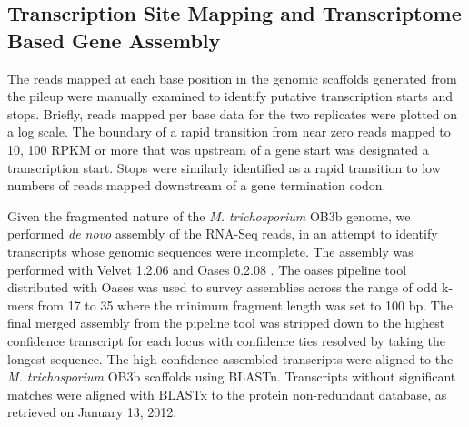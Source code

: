 \subsection{Transcription Site Mapping and Transcriptome Based Gene Assembly}
The reads mapped at each base position in the genomic scaffolds generated from the pileup were manually examined to identify putative transcription starts and stops.
Briefly, reads mapped per base data for the two replicates were plotted on a log scale.
The boundary of a rapid transition from near zero reads mapped to 10, 100 RPKM or more that was upstream of a gene start was designated a transcription start.
Stops were similarly identified as a rapid transition to low numbers of reads mapped downstream of a gene termination codon.

Given the fragmented nature of the \textit{M. trichosporium} OB3b genome, we performed \textit{de novo} assembly of the RNA-Seq reads, in an attempt to identify transcripts whose genomic sequences were incomplete.
The assembly was performed with Velvet 1.2.06 \cite{zerbino2008} and Oases 0.2.08 \cite{schulz2012}.
The oases pipeline tool distributed with Oases was used to survey assemblies across the range of odd k-mers from 17 to 35 where the minimum fragment length was set to 100 bp.
The final merged assembly from the pipeline tool was stripped down to the highest confidence transcript for each locus with confidence ties resolved by taking the longest sequence.
The high confidence assembled transcripts were aligned to the \textit{M. trichosporium} OB3b scaffolds using BLASTn.
Transcripts without significant matches were aligned with BLASTx to the protein non-redundant database, as retrieved on January 13, 2012.


